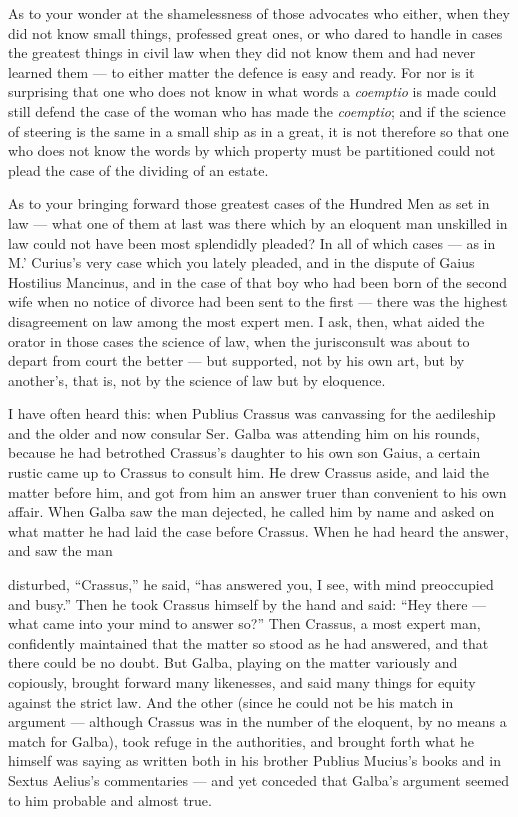  As to your wonder at the shamelessness of those advocates who either, when they did not know small things, professed great ones, or who dared to handle in cases the greatest things in civil law when they did not know them and had never learned them — to either matter the defence is easy and ready. For nor is it surprising that one who does not know in what words a \textit{coemptio} is made could still defend the case of the woman who has made the \textit{coemptio}; and if the science of steering is the same in a small ship as in a great, it is not therefore so that one who does not know the words by which property must be partitioned could not plead the case of the dividing of an estate.

 As to your bringing forward those greatest cases of the Hundred Men as set in law — what one of them at last was there which by an eloquent man unskilled in law could not have been most splendidly pleaded? In all of which cases — as in M.' Curius's very case which you lately pleaded, and in the dispute of Gaius Hostilius Mancinus, and in the case of that boy who had been born of the second wife when no notice of divorce had been sent to the first — there was the highest disagreement on law among the most expert men. I ask, then, what aided the orator in those cases the science of law, when the jurisconsult was about to depart from court the better — but supported, not by his own art, but by another's, that is, not by the science of law but by eloquence.

 I have often heard this: when Publius Crassus was canvassing for the aedileship and the older and now consular Ser. Galba was attending him on his rounds, because he had betrothed Crassus's daughter to his own son Gaius, a certain rustic came up to Crassus to consult him. He drew Crassus aside, and laid the matter before him, and got from him an answer truer than convenient to his own affair. When Galba saw the man dejected, he called him by name and asked on what matter he had laid the case before Crassus. When he had heard the answer, and saw the man

 disturbed, ``Crassus,'' he said, ``has answered you, I see, with mind preoccupied and busy.'' Then he took Crassus himself by the hand and said: ``Hey there — what came into your mind to answer so?'' Then Crassus, a most expert man, confidently maintained that the matter so stood as he had answered, and that there could be no doubt. But Galba, playing on the matter variously and copiously, brought forward many likenesses, and said many things for equity against the strict law. And the other (since he could not be his match in argument — although Crassus was in the number of the eloquent, by no means a match for Galba), took refuge in the authorities, and brought forth what he himself was saying as written both in his brother Publius Mucius's books and in Sextus Aelius's commentaries — and yet conceded that Galba's argument seemed to him probable and almost true.

